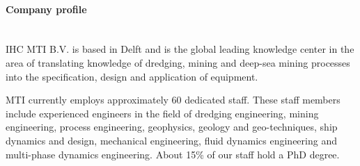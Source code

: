 \documentclass[a4paper,11pt]{../LatexDocStructures/MTItexMemo} %
\begin{document}
\paragraph{Company profile}\mbox{} \\
IHC MTI B.V. is based in Delft and is the global leading knowledge center in the area of translating knowledge of dredging, mining and deep-sea mining processes into the specification, design and application of equipment. 

MTI currently employs approximately 60 dedicated staff. These staff members include experienced engineers in the field of dredging engineering, mining engineering, process engineering, geophysics, geology and geo-techniques, ship dynamics and design, mechanical engineering, fluid dynamics engineering and multi-phase dynamics engineering. About 15\% of our staff hold a PhD degree.

\end{document}
